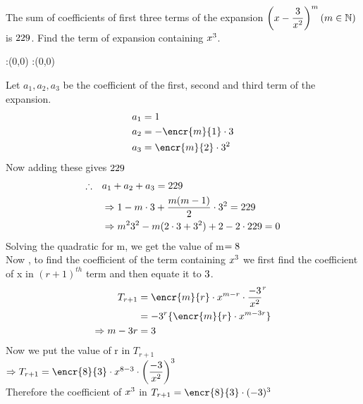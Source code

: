 \question[5] The sum of coefficients of first three terms of the expansion $\left( x- \dfrac{3}{x^{2}} \right) ^{m} (m \in \mathbb{N})$ is $229$. Find the term of expansion containing $x^{3}$.

\insertQR{}

\watchout

\ifprintanswers
  \begin{marginfigure}
      :(0,0)
      :(0,0)
    \figdrawbegin{}
      \figdrawline [100,101]
    \figdrawend
    \figvisu{\figBoxA}{}{%
    }
    \centerline{\box\figBoxA}
  \end{marginfigure}
\fi 

\begin{solution}[\fullpage]
Let $a_{1}, a_{2},a_{3}$ be the coefficient of the first, second and third term of the expansion. \\
	\begin{align}
	a_{1} &= 1 \\ 
	a_{2} &= -\encr{m}{1} \cdot \vbone \\
	a_{3} &= \encr{m}{2} \cdot \vbone^{2} 
	\end{align}    
Now adding these gives $229$\\
\begin{align}
\therefore \quad &a_{1} + a_{2} + a_{3} = 229 \\
&\Rightarrow 1 - m\cdot3 + \dfrac{m(m-1)}{2} \cdot 3^{2} = 229 \\
&\Rightarrow m^{2}3^{2} - m(2\cdot 3 + 3^{2}) + 2 - 2\cdot 229 = 0 
\end{align}
Solving the quadratic for m, we get the value of m$ = 8$ \\ 
Now , to find the coefficient of the term containing $x^{3}$ we first find the coefficient of x in $(r+1)^{th}$ term and then equate it to $3$. \\
\begin{align}
T_{r+1} &= \encr{m}{r} \cdot x^{m-r} \cdot {\dfrac{-\vbone}{x^{2}}}^{r} \\
&= {-\vbone}^{r} \lbrace \encr{m}{r} \cdot x^{m-3r} \rbrace \\
\Rightarrow m - 3r &=\vbfour 
\end{align} 
Now we put the value of r in ${T}_{r+1}$\\
$\Rightarrow T_{r+1} = \encr{\vbthree}{\vbfive} \cdot x^{\vbthree-\vbfive} \cdot {\left(\dfrac{-\vbone}{x^{2}}\right)}^{\vbfive}$ \\
Therefore the coefficient of $x^{3}$ in $T_{r+1} = \encr{\vbthree}{\vbfive} \cdot (-\vbone)^{\vbfive}$
\end{solution}

